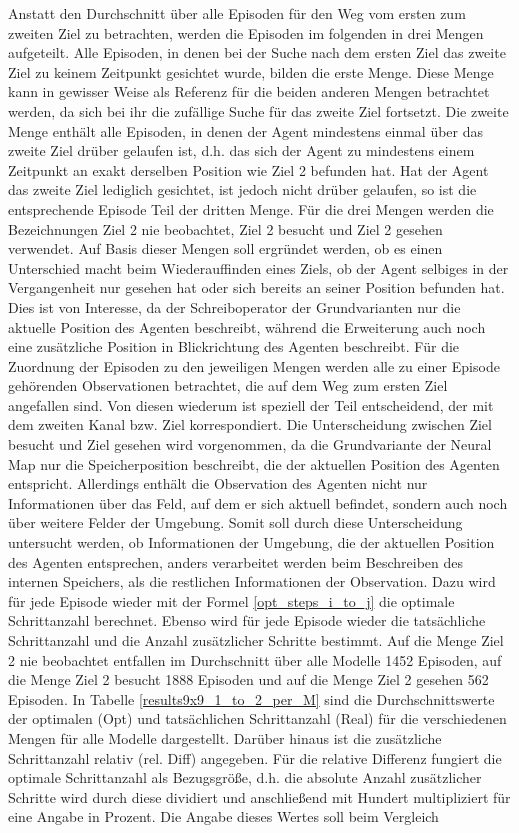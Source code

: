 Anstatt den Durchschnitt über alle Episoden für den Weg vom ersten zum zweiten Ziel zu betrachten, werden die Episoden im folgenden in drei Mengen aufgeteilt. Alle Episoden, in denen bei der Suche nach dem ersten Ziel das zweite Ziel zu keinem Zeitpunkt gesichtet wurde, bilden die erste Menge. Diese Menge kann in gewisser Weise als Referenz für die beiden anderen Mengen betrachtet werden, da sich bei ihr die zufällige Suche für das zweite Ziel fortsetzt. Die zweite Menge enthält alle Episoden, in denen der Agent mindestens einmal über das zweite Ziel drüber gelaufen ist, d.h. das sich der Agent zu mindestens einem Zeitpunkt an exakt derselben Position wie Ziel 2 befunden hat. Hat der Agent das zweite Ziel lediglich gesichtet, ist jedoch nicht drüber gelaufen, so ist die entsprechende Episode Teil der dritten Menge. Für die drei Mengen werden die Bezeichnungen \glqq Ziel 2 nie beobachtet\grqq{}, \glqq Ziel 2 besucht\grqq{} und \glqq Ziel 2 gesehen\grqq{} verwendet. Auf Basis dieser Mengen soll ergründet werden, ob es einen Unterschied macht beim Wiederauffinden eines Ziels, ob der Agent selbiges in der Vergangenheit nur gesehen hat oder sich bereits an seiner Position befunden hat. Dies ist von Interesse, da der Schreiboperator der Grundvarianten nur die aktuelle Position des Agenten beschreibt, während die Erweiterung auch noch eine zusätzliche Position in Blickrichtung des Agenten beschreibt. Für die Zuordnung der Episoden zu den jeweiligen Mengen werden alle zu einer Episode gehörenden Observationen betrachtet, die auf dem Weg zum ersten Ziel angefallen sind. Von diesen wiederum ist speziell der Teil entscheidend, der mit dem zweiten Kanal bzw. Ziel korrespondiert. Die Unterscheidung zwischen \glqq Ziel\grqq{} besucht und \glqq Ziel\grqq{} gesehen wird vorgenommen, da die Grundvariante der Neural Map nur die Speicherposition beschreibt, die der aktuellen Position des Agenten entspricht. Allerdings enthält die Observation des Agenten nicht nur Informationen über das Feld, auf dem er sich aktuell befindet, sondern auch noch über weitere Felder der Umgebung. Somit soll durch diese Unterscheidung untersucht werden, ob Informationen der Umgebung, die der aktuellen Position des Agenten entsprechen, anders verarbeitet werden beim Beschreiben des internen Speichers, als die restlichen Informationen der Observation. Dazu wird für jede Episode wieder mit der Formel \ref{opt_steps_i_to_j} die optimale Schrittanzahl berechnet. Ebenso wird für jede Episode wieder die tatsächliche Schrittanzahl und die Anzahl zusätzlicher Schritte bestimmt. Auf die Menge \glqq Ziel 2 nie beobachtet\grqq{} entfallen im Durchschnitt über alle Modelle 1452 Episoden, auf die Menge \glqq Ziel 2 besucht\grqq{} 1888 Episoden und auf die Menge \glqq Ziel 2 gesehen\grqq{} 562 Episoden. In Tabelle \ref{results9x9_1_to_2_per_M} sind die Durchschnittswerte der optimalen (Opt) und tatsächlichen Schrittanzahl (Real) für die verschiedenen Mengen für alle Modelle dargestellt. Darüber hinaus ist die zusätzliche Schrittanzahl relativ (rel. Diff) angegeben. Für die relative Differenz fungiert die optimale Schrittanzahl als Bezugsgröße, d.h. die absolute Anzahl zusätzlicher Schritte wird durch diese dividiert und anschließend mit Hundert multipliziert für eine Angabe in Prozent. Die Angabe dieses Wertes soll beim Vergleich 